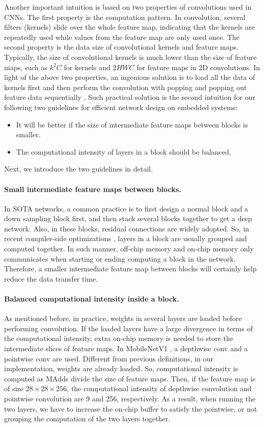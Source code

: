 \documentclass{article}
\begin{document}
Another important intuition is based on two properties of convolutions used in CNNs. The first property is the computation pattern. In convolution, several filters (kernels) slide over the whole feature map, indicating that the kernels are repeatedly used while values from the feature map are only used once. The second property is the data size of convolutional kernels and feature maps. Typically, the size of convolutional kernels is much lower than the size of feature maps, such as $k^2C$ for kernels and $2HWC$ for feature maps in 2D convolutions. 
In light of the above two properties, an ingenious solution is to load all the data of kernels first and then perform the convolution with popping and popping out feature data sequentially \cite{xing2019dnnvm} .
Such practical solution is the second intuition for our following two guidelines for efficient network design on embedded systems:
\begin{itemize}
\item It will be better if the size of intermediate feature maps between blocks is smaller.
\item The computational intensity of layers in a block should be balanced.
\end{itemize}
Next, we introduce the two guidelines in detail.

\paragraph{Small intermediate feature maps between blocks.}
In SOTA networks, a common practice is to first design a normal block and a down sampling block first, and then stack several blocks together to get a deep network. 
Also, in these blocks, residual connections \cite{he2016deep} are widely adopted. So, in recent compiler-side optimizations \cite{xing2019dnnvm}
, layers in a block are usually grouped and computed together. 
In such manner, off-chip memory and on-chip memory only communicates when starting or ending computing a block in the network.
Therefore, a smaller intermediate feature map between blocks will certainly help reduce the data transfer time.

\paragraph{Balanced computational intensity inside a block.}
As mentioned before, in practice, weights in several layers are loaded before performing convolution. If the loaded layers have a large divergence in terms of the computational intensity, extra on-chip memory is needed to store the intermediate slices of feature maps. In MobileNetV1 \cite{howard2017mobilenets}, a depthwise conv and a pointwise conv are used. Different from previous definitions, in our implementation, weights are already loaded. So, computational intensity is computed as MAdds divide the size of feature maps. Then, if the feature map is of size $28\times28\times256$, the computational intensity of depthwise convolution and pointwise convolution are 9 and 256, respectively. 
As a result, when running the two layers, we have to increase the on-chip buffer to satisfy the pointwise, or not grouping the computation of the two layers together.
\end{document}
